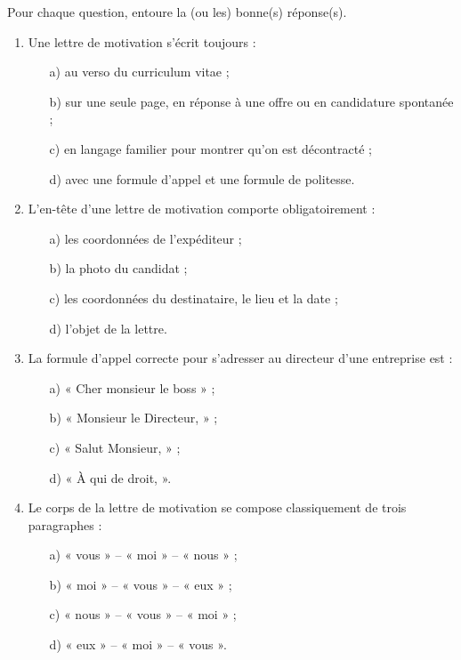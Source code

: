 \documentclass[11pt]{article}
\begin{document}
\begin{exercice}
Pour chaque question, entoure la (ou les) bonne(s) réponse(s).
\begin{enumerate}
\item Une lettre de motivation s'écrit toujours :
\begin{enumerate}
\item[a)] au verso du curriculum vitae ;
\item[b)] sur une seule page, en réponse à une offre ou en candidature spontanée ;
\item[c)] en langage familier pour montrer qu'on est décontracté ;
\item[d)] avec une formule d'appel et une formule de politesse.
\end{enumerate}
\item L'en-tête d'une lettre de motivation comporte obligatoirement :
\begin{enumerate}
\item[a)] les coordonnées de l'expéditeur ;
\item[b)] la photo du candidat ;
\item[c)] les coordonnées du destinataire, le lieu et la date ;
\item[d)] l'objet de la lettre.
\end{enumerate}
\item La formule d'appel correcte pour s'adresser au directeur d'une entreprise est :
\begin{enumerate}
\item[a)] « Cher monsieur le boss » ;
\item[b)] « Monsieur le Directeur, » ;
\item[c)] « Salut Monsieur, » ;
\item[d)] « À qui de droit, ».
\end{enumerate}
\item Le corps de la lettre de motivation se compose classiquement de trois paragraphes :
\begin{enumerate}
\item[a)] « vous » – « moi » – « nous » ;
\item[b)] « moi » – « vous » – « eux » ;
\item[c)] « nous » – « vous » – « moi » ;
\item[d)] « eux » – « moi » – « vous ».
\end{enumerate}
\end{enumerate}
\end{exercice}
\end{document}
